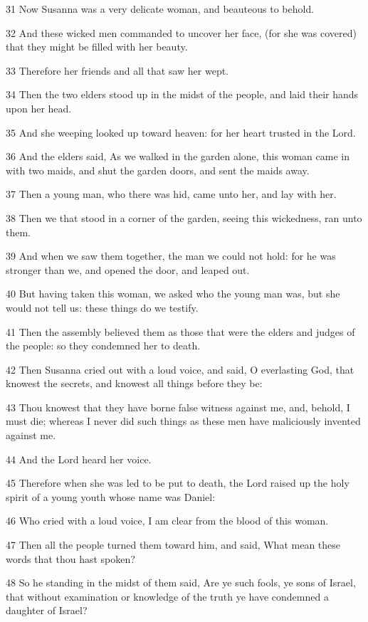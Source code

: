 \par 31 Now Susanna was a very delicate woman, and beauteous to behold.
\par 32 And these wicked men commanded to uncover her face, (for she was covered) that they might be filled with her beauty.
\par 33 Therefore her friends and all that saw her wept.
\par 34 Then the two elders stood up in the midst of the people, and laid their hands upon her head.
\par 35 And she weeping looked up toward heaven: for her heart trusted in the Lord.
\par 36 And the elders said, As we walked in the garden alone, this woman came in with two maids, and shut the garden doors, and sent the maids away.
\par 37 Then a young man, who there was hid, came unto her, and lay with her.
\par 38 Then we that stood in a corner of the garden, seeing this wickedness, ran unto them.
\par 39 And when we saw them together, the man we could not hold: for he was stronger than we, and opened the door, and leaped out.
\par 40 But having taken this woman, we asked who the young man was, but she would not tell us: these things do we testify.
\par 41 Then the assembly believed them as those that were the elders and judges of the people: so they condemned her to death.
\par 42 Then Susanna cried out with a loud voice, and said, O everlasting God, that knowest the secrets, and knowest all things before they be:
\par 43 Thou knowest that they have borne false witness against me, and, behold, I must die; whereas I never did such things as these men have maliciously invented against me.
\par 44 And the Lord heard her voice.
\par 45 Therefore when she was led to be put to death, the Lord raised up the holy spirit of a young youth whose name was Daniel:
\par 46 Who cried with a loud voice, I am clear from the blood of this woman.
\par 47 Then all the people turned them toward him, and said, What mean these words that thou hast spoken?
\par 48 So he standing in the midst of them said, Are ye such fools, ye sons of Israel, that without examination or knowledge of the truth ye have condemned a daughter of Israel?
